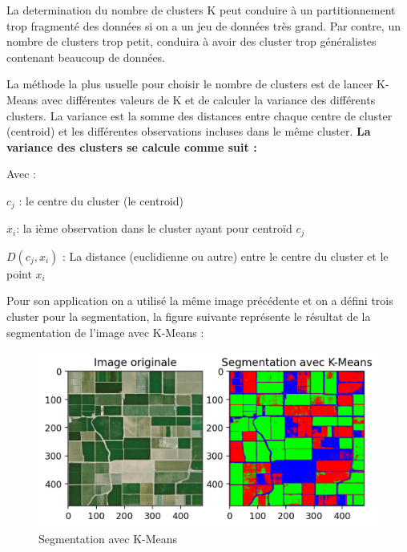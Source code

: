 \documentclass[12pt, openany]{report}
\begin{document}
La determination du nombre de clusters K peut conduire à un partitionnement trop fragmenté des données si on a un jeu de données très grand. Par contre, un nombre de clusters trop petit, conduira à avoir des cluster trop généralistes contenant beaucoup de données.

La méthode la plus usuelle pour choisir le nombre de clusters est de lancer K-Means avec différentes valeurs de K et de calculer la variance des différents clusters.  La variance est la somme des distances entre chaque centre de cluster (centroid) et les différentes observations incluses dans le même cluster. 
\newline
\textbf{ La variance des clusters se calcule comme suit :\\}
    
Avec :
\begin{mylist}


\item $c_j$ : le centre du cluster (le centroid)
\item $x_i$: la ième observation dans le cluster ayant pour centroïd $c_j$
\item $D(c_j,x_i)$ : La distance (euclidienne ou autre) entre le centre du cluster et le point $x_i$
\end{mylist}


\par
Pour son application on a utilisé la même image précédente et on a défini trois cluster pour la segmentation, la figure suivante représente le résultat de la segmentation de l'image avec K-Means : 

\begin{figure}[H]
\centering
\includegraphics[scale=1.2]{kmeans.png}
\caption{Segmentation avec K-Means}
\end{figure}
\end{document}
